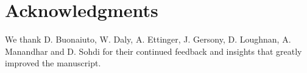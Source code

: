 \documentclass{article}\usepackage[]{graphicx}\usepackage[]{color}
\begin{document}
\section*{Acknowledgments}

We thank D. Buonaiuto, W. Daly, A. Ettinger, J. Gersony, D. Loughnan, A. Manandhar and D. Sohdi for their continued feedback and insights that greatly improved the manuscript.



  
\end{document}
